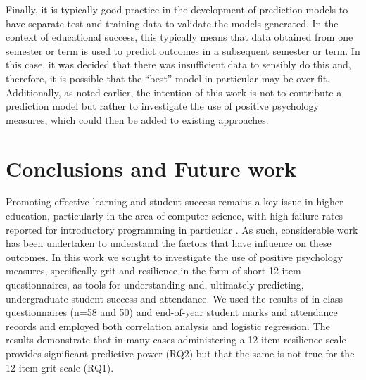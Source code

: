 \documentclass[sigconf]{acmart}
\begin{document}
Finally, it is typically good practice in the development of prediction models to have separate test and training data to validate the models generated. In the context of educational success, this typically means that data obtained from one semester or term is used to predict outcomes in a subsequent semester or term. In this case, it was decided that there was insufficient data to sensibly do this and, therefore, it is possible that the ``best'' model in particular may be over fit. Additionally, as noted earlier, the intention of this work is not to contribute a prediction model but rather to investigate the use of positive psychology measures, which could then be added to existing approaches.

\section{Conclusions and Future work}

Promoting effective learning and student success remains a key issue in higher education, particularly in the area of computer science, with high failure rates reported for introductory programming in particular \cite{Watson:2014:FRI:2591708.2591749,Bennedsen2019}. As such, considerable work has been undertaken to understand the factors that have influence on these outcomes. In this work we sought to investigate the use of positive psychology measures, specifically grit and resilience in the form of short 12-item questionnaires, as tools for understanding and, ultimately predicting, undergraduate student success and attendance. We used the results of in-class questionnaires (n=58 and 50) and end-of-year student marks and attendance records and employed both correlation analysis and logistic regression. The results demonstrate that in many cases administering a 12-item resilience scale provides significant predictive power (RQ2) but that the same is not true for the 12-item grit scale (RQ1).
\end{document}
